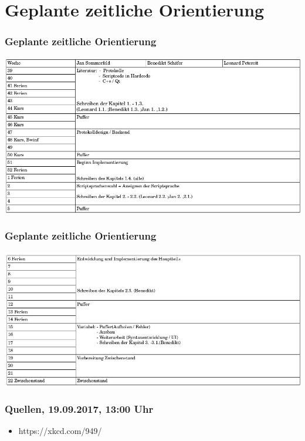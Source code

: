 \documentclass[newPxFont,numfooter,sectionpages]{beamer}
\begin{document}
\section{Geplante zeitliche Orientierung}
\begin{frame}
\frametitle{Geplante zeitliche Orientierung}
\includegraphics[scale=0.31]{z}
\end{frame}
\begin{frame}
\frametitle{Geplante zeitliche Orientierung}
\includegraphics[scale=0.31]{z1}
\end{frame}

\maketitle

\begin{frame}
\frametitle{Quellen, 19.09.2017, 13:00 Uhr}
\begin{itemize}
\item{https://xkcd.com/949/}
\end{itemize}

\end{frame}
\end{document}
